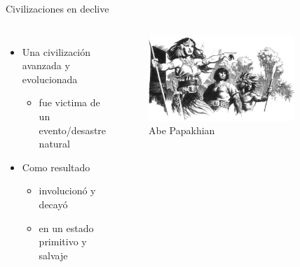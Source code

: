 \begin{frame}{Civilizaciones en declive}
	\begin{columns}
		\begin{itemize}
			\item Una civilización avanzada y evolucionada
			\begin{itemize}
				\item fue victima de un evento/desastre natural
			\end{itemize}
			\item Como resultado
			\begin{itemize}
				\item involucionó y decayó
				\item en un estado primitivo y salvaje
			\end{itemize}
		\end{itemize}
		\begin{figure}[htb]
			\centering
			\includegraphics[width=0.8\textwidth]{img/tributos/elephant07}
			\caption{Abe Papakhian}
		\end{figure}
	\end{columns}
\end{frame}
\note[itemize]{
	\item
}

